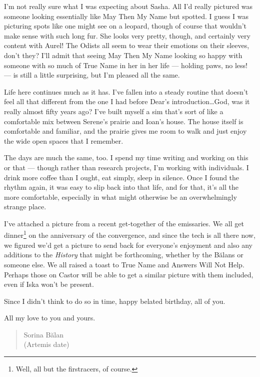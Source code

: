 I'm not really sure what I was expecting about Sasha. All I'd really pictured was someone looking essentially like May Then My Name but spotted. I guess I was picturing spots like one might see on a leopard, though of course that wouldn't make sense with such long fur. She looks very pretty, though, and certainly very content with Aurel! The Odists all seem to wear their emotions on their sleeves, don't they? I'll admit that seeing May Then My Name looking so happy with someone with so much of True Name in her in her life — holding paws, no less! — is still a little surprising, but I'm pleased all the same.

Life here continues much as it has. I've fallen into a steady routine that doesn't feel all that different from the one I had before Dear's introduction\ldots{}God, was it really almost fifty years ago? I've built myself a sim that's sort of like a comfortable mix between Serene's prairie and Ioan's house. The house itself is comfortable and familiar, and the prairie gives me room to walk and just enjoy the wide open spaces that I remember.

The days are much the same, too. I spend my time writing and working on this or that — though rather than research projects, I'm working with individuals. I drink more coffee than I ought, eat simply, sleep in silence. Once I found the rhythm again, it was easy to slip back into that life, and for that, it's all the more comfortable, especially in what might otherwise be an overwhelmingly strange place.

I've attached a picture from a recent get-together of the emissaries. We all get dinner\footnote{Well, all but the firstracers, of course.} on the anniversary of the convergence, and since the tech is all there now, we figured we'd get a picture to send back for everyone's enjoyment and also any additions to the \emph{History} that might be forthcoming, whether by the Bălans or someone else. We all raised a toast to True Name and Answers Will Not Help. Perhaps those on Castor will be able to get a similar picture with them included, even if Iska won't be present.

Since I didn't think to do so in time, happy belated birthday, all of you.

All my love to you and yours.

\begin{quote}
Sorina Bălan\\
(Artemis date)
\end{quote}
